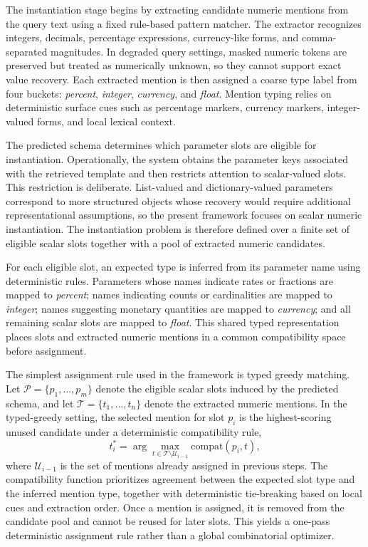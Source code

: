 \documentclass[pdflatex,sn-basic,Numbered]{sn-jnl}
\begin{document}
The instantiation stage begins by extracting candidate numeric mentions from the query text using a fixed rule-based pattern matcher. The extractor recognizes integers, decimals, percentage expressions, currency-like forms, and comma-separated magnitudes. In degraded query settings, masked numeric tokens are preserved but treated as numerically unknown, so they cannot support exact value recovery. Each extracted mention is then assigned a coarse type label from four buckets: \emph{percent}, \emph{integer}, \emph{currency}, and \emph{float}. Mention typing relies on deterministic surface cues such as percentage markers, currency markers, integer-valued forms, and local lexical context.

The predicted schema determines which parameter slots are eligible for instantiation. Operationally, the system obtains the parameter keys associated with the retrieved template and then restricts attention to scalar-valued slots. This restriction is deliberate. List-valued and dictionary-valued parameters correspond to more structured objects whose recovery would require additional representational assumptions, so the present framework focuses on scalar numeric instantiation. The instantiation problem is therefore defined over a finite set of eligible scalar slots together with a pool of extracted numeric candidates.

For each eligible slot, an expected type is inferred from its parameter name using deterministic rules. Parameters whose names indicate rates or fractions are mapped to \emph{percent}; names indicating counts or cardinalities are mapped to \emph{integer}; names suggesting monetary quantities are mapped to \emph{currency}; and all remaining scalar slots are mapped to \emph{float}. This shared typed representation places slots and extracted numeric mentions in a common compatibility space before assignment.

The simplest assignment rule used in the framework is typed greedy matching. Let $\mathcal{P}=\{p_1,\dots,p_m\}$ denote the eligible scalar slots induced by the predicted schema, and let $\mathcal{T}=\{t_1,\dots,t_n\}$ denote the extracted numeric mentions. In the typed-greedy setting, the selected mention for slot $p_i$ is the highest-scoring unused candidate under a deterministic compatibility rule,
\begin{equation}
t_i^{*} = \arg\max_{t \in \mathcal{T}\setminus \mathcal{U}_{i-1}} \mathrm{compat}(p_i,t),
\label{eq:typed_assignment}
\end{equation}
where $\mathcal{U}_{i-1}$ is the set of mentions already assigned in previous steps. The compatibility function prioritizes agreement between the expected slot type and the inferred mention type, together with deterministic tie-breaking based on local cues and extraction order. Once a mention is assigned, it is removed from the candidate pool and cannot be reused for later slots. This yields a one-pass deterministic assignment rule rather than a global combinatorial optimizer.
\end{document}
